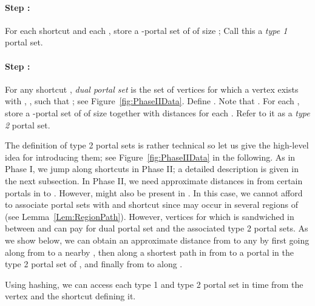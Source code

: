 \documentclass[11pt]{article}
\begin{document}
\paragraph{Step :} For each shortcut  and each , store a -portal set  of  of size ; Call this a \emph{type 1} portal set.

\paragraph{Step :} For any shortcut , \emph{dual portal set}  is the set of vertices  for which a vertex  exists with , , such that ; see Figure~\ref{fig:PhaseIIData}.
Define . Note that . For each , store a -portal set  of  of size  together with distances  for each . Refer to it as a \emph{type 2} portal set.

The definition of type 2 portal sets is rather technical so let us give the high-level idea for introducing them; see Figure~\ref{fig:PhaseIIData} in the following. As in Phase I, we jump along shortcuts  in Phase II; a detailed description is given in the next subsection. In Phase II, we need approximate distances in  from certain portals  in  to . However,  might also be present in . In this case, we cannot afford to associate portal sets with  and shortcut  since  may occur in several regions of  (see Lemma~\ref{Lem:RegionPath}). However, vertices  for which  is sandwiched in between  and  can pay for dual portal set  and the associated type 2 portal sets. As we show below, we can obtain an approximate distance from  to any  by first going along  from  to a nearby , then along a shortest path in  from  to a portal  in the type 2 portal set of , and finally from  to  along .

Using hashing, we can access each type 1 and type 2 portal set in  time from the vertex and the shortcut defining it.
\end{document}
